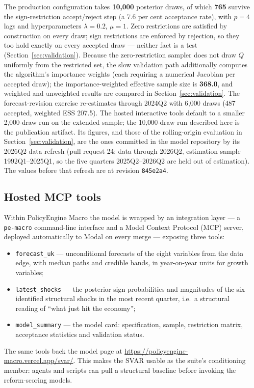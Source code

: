 The production configuration takes \textbf{10{,}000} posterior draws, of which \textbf{765} survive the sign-restriction accept/reject step (a 7.6 per cent acceptance rate), with $p=4$ lags and hyperparameters $\lambda = 0.2$, $\mu = 1$. Zero restrictions are satisfied by construction on every draw; sign restrictions are enforced by rejection, so they too hold exactly on every accepted draw --- neither fact is a test (Section~\ref{sec:validation}). Because the \citet{arias2018} zero-restriction sampler does not draw $Q$ uniformly from the restricted set, the slow validation path additionally computes the algorithm's importance weights (each requiring a numerical Jacobian per accepted draw); the importance-weighted effective sample size is \textbf{368.0}, and weighted and unweighted results are compared in Section~\ref{sec:validation}. The forecast-revision exercise re-estimates through 2024Q2 with 6{,}000 draws (487 accepted, weighted ESS 207.5). The hosted interactive tools default to a smaller 2{,}000-draw run on the extended sample; the 10{,}000-draw run described here is the publication artifact. Its figures, and those of the rolling-origin evaluation in Section~\ref{sec:validation}, are the ones committed in the model repository by its 2026Q2 data refresh (pull request 24; data through 2026Q2, estimation sample 1992Q1--2025Q1, so the five quarters 2025Q2--2026Q2 are held out of estimation). The values before that refresh are at revision \texttt{845e2a4}.

\subsection{Hosted MCP tools}

Within PolicyEngine Macro the model is wrapped by an integration layer --- a \texttt{pe-macro} command-line interface and a Model Context Protocol (MCP) server, deployed automatically to Modal on every merge --- exposing three tools:

\begin{itemize}
\item \texttt{forecast\_uk} --- unconditional forecasts of the eight variables from the data edge, with median paths and credible bands, in year-on-year units for growth variables;
\item \texttt{latest\_shocks} --- the posterior sign probabilities and magnitudes of the six identified structural shocks in the most recent quarter, i.e.\ a structural reading of ``what just hit the economy'';
\item \texttt{model\_summary} --- the model card: specification, sample, restriction matrix, acceptance statistics and validation status.
\end{itemize}

\noindent The same tools back the model page at \url{https://policyengine-macro.vercel.app/svar/}. This makes the SVAR usable as the suite's conditioning member: agents and scripts can pull a structural baseline before invoking the reform-scoring models.
